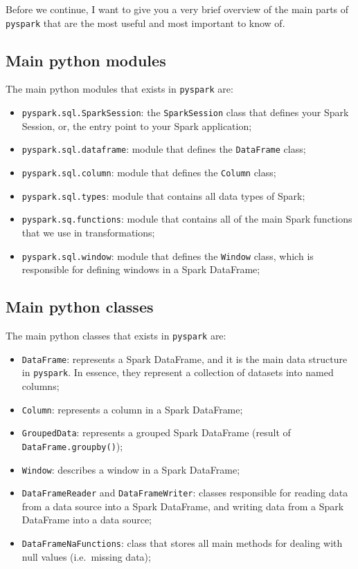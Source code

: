 \documentclass[
  11pt,
  letterpaper,
  DIV=11,
  numbers=noendperiod]{scrreprt}
\providecommand{\tightlist}{%
  \setlength{\itemsep}{0pt}\setlength{\parskip}{0pt}}\usepackage{longtable,booktabs,array}
\begin{document}
Before we continue, I want to give you a very brief overview of the main
parts of \texttt{pyspark} that are the most useful and most important to
know of.

\hypertarget{main-python-modules}{%
\subsection{Main python modules}\label{main-python-modules}}

The main python modules that exists in \texttt{pyspark} are:

\begin{itemize}
\tightlist
\item
  \texttt{pyspark.sql.SparkSession}: the \texttt{SparkSession} class
  that defines your Spark Session, or, the entry point to your Spark
  application;
\item
  \texttt{pyspark.sql.dataframe}: module that defines the
  \texttt{DataFrame} class;
\item
  \texttt{pyspark.sql.column}: module that defines the \texttt{Column}
  class;
\item
  \texttt{pyspark.sql.types}: module that contains all data types of
  Spark;
\item
  \texttt{pyspark.sq.functions}: module that contains all of the main
  Spark functions that we use in transformations;
\item
  \texttt{pyspark.sql.window}: module that defines the \texttt{Window}
  class, which is responsible for defining windows in a Spark DataFrame;
\end{itemize}

\hypertarget{main-python-classes}{%
\subsection{Main python classes}\label{main-python-classes}}

The main python classes that exists in \texttt{pyspark} are:

\begin{itemize}
\item
  \texttt{DataFrame}: represents a Spark DataFrame, and it is the main
  data structure in \texttt{pyspark}. In essence, they represent a
  collection of datasets into named columns;
\item
  \texttt{Column}: represents a column in a Spark DataFrame;
\item
  \texttt{GroupedData}: represents a grouped Spark DataFrame (result of
  \texttt{DataFrame.groupby()});
\item
  \texttt{Window}: describes a window in a Spark DataFrame;
\item
  \texttt{DataFrameReader} and \texttt{DataFrameWriter}: classes
  responsible for reading data from a data source into a Spark
  DataFrame, and writing data from a Spark DataFrame into a data source;
\item
  \texttt{DataFrameNaFunctions}: class that stores all main methods for
  dealing with null values (i.e.~missing data);
\end{itemize}
\end{document}
